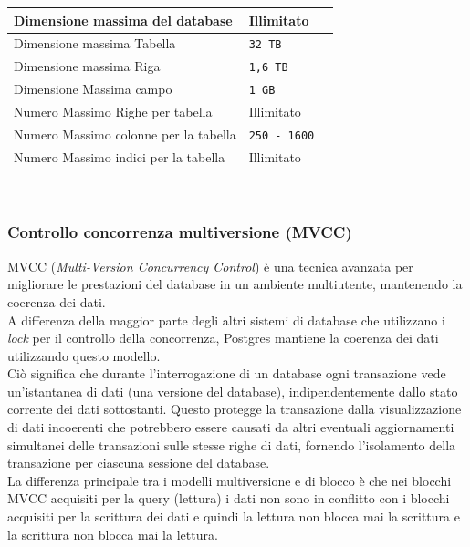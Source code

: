 \begin{tabular}{|l|l|r|}
\hline
Dimensione massima del database & Illimitato\\
\hline
Dimensione massima Tabella & \verb"32 TB"\\
\hline
Dimensione massima Riga & \verb"1,6 TB"\\
\hline
Dimensione Massima campo & \verb"1 GB"\\
\hline
Numero Massimo Righe per tabella & Illimitato\\
\hline
Numero Massimo colonne per la tabella & \verb"250 - 1600"\\
\hline
Numero Massimo indici per la tabella & Illimitato\cite{etichetta12}\\
\hline
\end{tabular}\\

\subsubsection{Controllo concorrenza multiversione (MVCC)}
MVCC (\textit{Multi-Version Concurrency Control}) \`{e} una tecnica avanzata per migliorare le prestazioni del database in un ambiente multiutente, mantenendo la coerenza dei dati. \\
A differenza della maggior parte degli altri sistemi di database che utilizzano i \textit{lock} per il controllo della concorrenza, Postgres mantiene la coerenza dei dati utilizzando questo modello. \\
Ci\`{o} significa che durante l'interrogazione di un database ogni transazione vede un'istantanea di dati (una versione del database), indipendentemente dallo stato corrente dei dati sottostanti. Questo protegge la transazione dalla visualizzazione di dati incoerenti che potrebbero essere causati da altri eventuali aggiornamenti simultanei delle transazioni sulle stesse righe di dati, fornendo l'isolamento della transazione per ciascuna sessione del database.\cite{etichetta15}\\

La differenza principale tra i modelli multiversione e di blocco \`{e} che nei blocchi MVCC acquisiti per la query (lettura) i dati non sono in conflitto con i blocchi acquisiti per la scrittura dei dati e quindi la lettura non blocca mai la scrittura e la scrittura non blocca mai la lettura.

